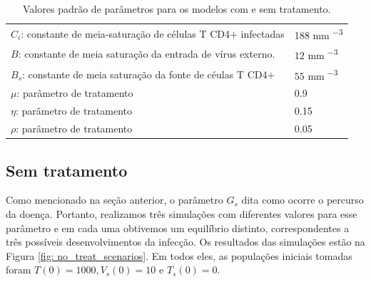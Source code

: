 \begin{table}[ht!]
\begin{center}
\begin{tabular}{l l}
           \( C_{ i } \): constante de meia-saturação de células T CD4+ infectadas & 188 \unit{mm^{ -3 }} \\
           \( B \): constante de meia saturação da entrada de vírus externo. & \( 12 \) \unit{mm^{ -3 }} \\
           \( B_{ s } \): constante de meia saturação da fonte de céulas T CD4+ & \( 55 \) \unit{mm^{ -3 }} \\
           \( \mu \): parâmetro de tratamento & 0.9 \\
           \( \eta \): parâmetro de tratamento & 0.15 \\
           \( \rho \): parâmetro de tratamento & 0.05 \\
           \hline
        \end{tabular}
        \caption{Valores padrão de parâmetros para os modelos com e sem tratamento.}
        \label{tab: params}
    \end{center}
\end{table}

\subsection{Sem tratamento}

Como mencionado na seção anterior, o parâmetro \( G_{ s } \) dita como ocorre o percurso da doença.
Portanto, realizamos três simulações com diferentes valores para esse parâmetro e em cada uma obtivemos um equilíbrio distinto, correspondentes a três possíveis desenvolvimentos da infecção.
Os resultados das simulações estão na Figura \ref{fig: no_treat_scenarios}.
Em todos eles, as populações iniciais tomadas foram \( T ( 0 ) = 1000, V_{ s } ( 0 ) = 10 \) e \( T_{ s } ( 0 ) = 0 \).

